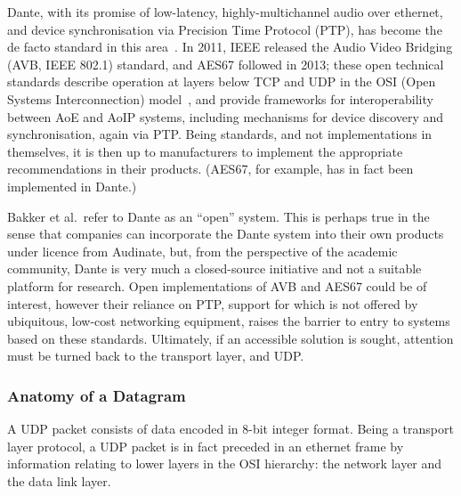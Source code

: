 Dante, with its promise of low-latency, highly-multichannel audio over ethernet,
and device synchronisation via Precision Time Protocol (PTP), has become the de
facto standard in this area~\citep{bakker_introduction_2014}.
In 2011, IEEE released the Audio Video Bridging (AVB, IEEE 802.1) standard,
and AES67 followed in 2013; these open technical standards describe operation
at layers below TCP and UDP in the OSI (Open Systems Interconnection)
model~\citep{}, and
provide frameworks for interoperability between AoE and AoIP systems, including
mechanisms for device discovery and synchronisation, again via PTP\@.
Being standards, and not implementations in themselves, it is then up to
manufacturers to implement the appropriate recommendations in their products.
(AES67, for example, has in fact been implemented in Dante.)

Bakker et al.\ refer to Dante as an ``open'' system.
This is perhaps true in the sense that companies can incorporate the Dante
system into their own products under licence from Audinate, but, from the
perspective of the academic community, Dante is very much a closed-source
initiative and not a suitable platform for research.
Open implementations of AVB and AES67 could be of interest, however their
reliance on PTP, support for which is not offered by ubiquitous, low-cost
networking equipment, raises the barrier to entry to systems based on these
standards.
Ultimately, if an accessible solution is sought, attention must be turned back
to the transport layer, and UDP\@.

\subsubsection{Anatomy of a Datagram}\label{subsubsec:anatomy-of-a-datagram}


A UDP packet consists of data encoded in 8-bit integer format.
Being a transport layer protocol, a UDP packet is in fact preceded in an
ethernet frame by information relating to lower layers in the OSI hierarchy: the
network layer and the data link layer.

